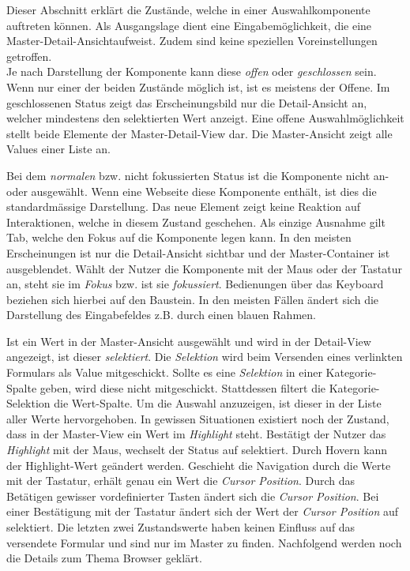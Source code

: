Dieser Abschnitt erklärt die Zustände, welche in einer Auswahlkomponente auftreten können.
Als Ausgangslage dient eine Eingabemöglichkeit, die eine Master-Detail-Ansicht\footnotemark aufweist.
Zudem sind keine speziellen Voreinstellungen getroffen.
\\
Je nach Darstellung der Komponente kann diese \emph{offen} oder \emph{geschlossen} sein.
Wenn nur einer der beiden Zustände möglich ist, ist es meistens der Offene.
Im geschlossenen Status zeigt das Erscheinungsbild nur die Detail-Ansicht an, welcher mindestens den selektierten Wert anzeigt.
Eine offene Auswahlmöglichkeit stellt beide Elemente der Master-Detail-View dar.
Die Master-Ansicht zeigt alle Values einer Liste an.

Bei dem \emph{normalen} bzw. nicht fokussierten Status ist die Komponente nicht an- oder ausgewählt.
Wenn eine Webseite diese Komponente enthält, ist dies die standardmässige Darstellung.
Das neue Element zeigt keine Reaktion auf Interaktionen, welche in diesem Zustand geschehen. 
Als einzige Ausnahme gilt Tab, welche den Fokus auf die Komponente legen kann. 
In den meisten Erscheinungen ist nur die Detail-Ansicht sichtbar und der Master-Container ist ausgeblendet.
Wählt der Nutzer die Komponente mit der Maus oder der Tastatur an, steht sie im \emph{Fokus} bzw. ist sie \emph{fokussiert}.
Bedienungen über das Keyboard beziehen sich hierbei auf den Baustein.
In den meisten Fällen ändert sich die Darstellung des Eingabefeldes z.B. durch einen blauen Rahmen.

Ist ein Wert in der Master-Ansicht ausgewählt und wird in der Detail-View angezeigt, ist dieser \emph{selektiert}.
Die \emph{Selektion} wird beim Versenden eines verlinkten Formulars als Value mitgeschickt.
Sollte es eine \emph{Selektion} in einer Kategorie-Spalte geben, wird diese nicht mitgeschickt.
Stattdessen filtert die Kategorie-Selektion die Wert-Spalte.
Um die Auswahl anzuzeigen, ist dieser in der Liste aller Werte hervorgehoben.
In gewissen Situationen existiert noch der Zustand, dass in der Master-View ein Wert im \emph{Highlight} steht. 
Bestätigt der Nutzer das \emph{Highlight} mit der Maus, wechselt der Status auf selektiert.
Durch Hovern kann der Highlight-Wert geändert werden. 
Geschieht die Navigation durch die Werte mit der Tastatur, erhält genau ein Wert die \emph{Cursor Position}. 
Durch das Betätigen gewisser vordefinierter Tasten ändert sich die \emph{Cursor Position}.
Bei einer Bestätigung mit der Tastatur ändert sich der Wert der \emph{Cursor Position} auf selektiert.
Die letzten zwei Zustandswerte haben keinen Einfluss auf das versendete Formular und sind nur im Master zu finden.
Nachfolgend werden noch die Details zum Thema Browser geklärt.


